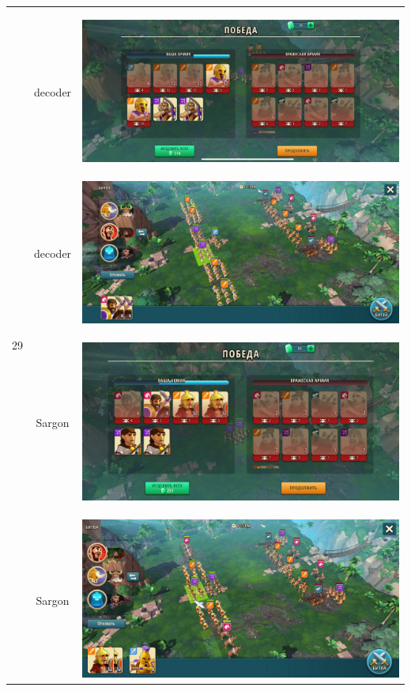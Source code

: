 \begin{longtable}{|c|c|c|}
    \hline
    \multirow{6}{*}{29} & decoder &
    \hypertarget{fight29}{\includegraphics[width=0.75\linewidth]{./parts/media/TreasureHunt/29/decoder/photo_2022-04-07_09-59-23.jpg}} \\
    & decoder &
    \includegraphics[width=0.75\linewidth]{./parts/media/TreasureHunt/29/decoder/photo_2022-04-07_09-59-10.jpg} \\
    \hline
    \multirow{6}{*}{29} & Sargon &
    \hypertarget{fight29}{\includegraphics[width=0.75\linewidth]{./parts/media/TreasureHunt/29/sargon/photo_2022-04-07_10-03-11.jpg}} \\
    & Sargon &
    \includegraphics[width=0.75\linewidth]{./parts/media/TreasureHunt/29/sargon/photo_2022-04-07_10-02-57.jpg} \\

\end{longtable}
